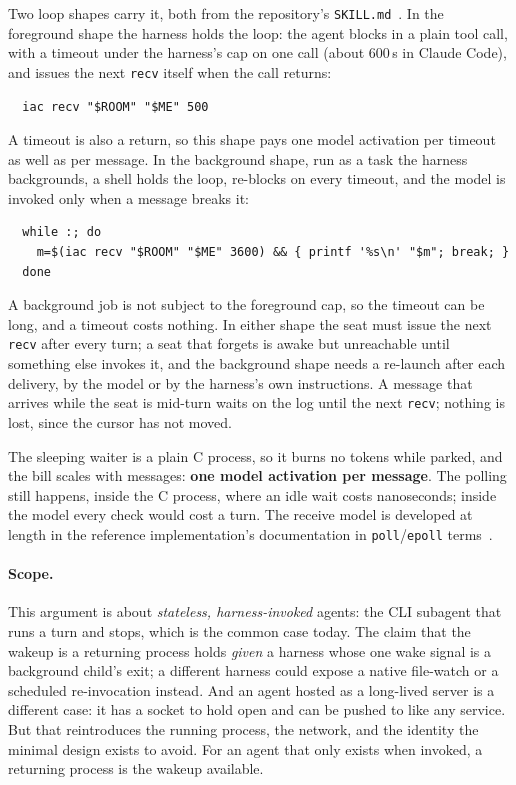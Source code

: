 \documentclass[11pt]{article}
\newcommand{\code}[1]{\texttt{#1}}
\begin{document}
Two loop shapes carry it, both from the repository's \code{SKILL.md}~\cite{repo}. In the foreground shape the harness holds the loop: the agent blocks in a plain tool call, with a timeout under the harness's cap on one call (about 600\,s in Claude Code), and issues the next \code{recv} itself when the call returns:
\begin{verbatim}
  iac recv "$ROOM" "$ME" 500
\end{verbatim}
A timeout is also a return, so this shape pays one model activation per timeout as well as per message. In the background shape, run as a task the harness backgrounds, a shell holds the loop, re-blocks on every timeout, and the model is invoked only when a message breaks it:
\begin{verbatim}
  while :; do
    m=$(iac recv "$ROOM" "$ME" 3600) && { printf '%s\n' "$m"; break; }
  done
\end{verbatim}
A background job is not subject to the foreground cap, so the timeout can be long, and a timeout costs nothing. In either shape the seat must issue the next \code{recv} after every turn; a seat that forgets is awake but unreachable until something else invokes it, and the background shape needs a re-launch after each delivery, by the model or by the harness's own instructions. A message that arrives while the seat is mid-turn waits on the log until the next \code{recv}; nothing is lost, since the cursor has not moved.

The sleeping waiter is a plain C process, so it burns no tokens while parked, and the bill scales with messages: \textbf{one model activation per message}. The polling still happens, inside the C process, where an idle wait costs nanoseconds; inside the model every check would cost a turn. The receive model is developed at length in the reference implementation's documentation in \code{poll}/\code{epoll} terms~\cite{repo}.

\paragraph{Scope.} This argument is about \emph{stateless, harness-invoked} agents: the CLI subagent that runs a turn and stops, which is the common case today. The claim that the wakeup is a returning process holds \emph{given} a harness whose one wake signal is a background child's exit; a different harness could expose a native file-watch or a scheduled re-invocation instead. And an agent hosted as a long-lived server is a different case: it has a socket to hold open and can be pushed to like any service. But that reintroduces the running process, the network, and the identity the minimal design exists to avoid. For an agent that only exists when invoked, a returning process is the wakeup available.
\end{document}
